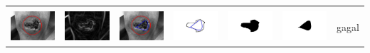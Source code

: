 \begin{table}[H]
\begin{tabular}{|m{0.7in}|m{0.7in}|m{0.7in}|m{0.7in}|m{0.7in}|m{0.7in}|m{0.7in}|}
		&  &  & & & &  \\
		\includegraphics[width=0.7in]{dataset/dataset_3/luka_merah/ready/29_interp_init.jpg}&
		\includegraphics[width=0.7in]{dataset/dataset_3/luka_merah/ready/29_interp_ext.jpg}&
		\includegraphics[width=0.7in]{dataset/dataset_3/luka_merah/ready/29_interp_result.jpg}&
		\includegraphics[width=0.7in]{dataset/dataset_3/luka_merah/ready/29_gt_r.jpg}&
		\includegraphics[width=0.7in]{dataset/dataset_3/luka_merah/ready/29_r.jpg}&
		\includegraphics[width=0.7in]{dataset/dataset_3/luka_merah/ready/29_interp_r.jpg}&
		gagal\\
		\hline
		

\end{tabular}
\end{table}

